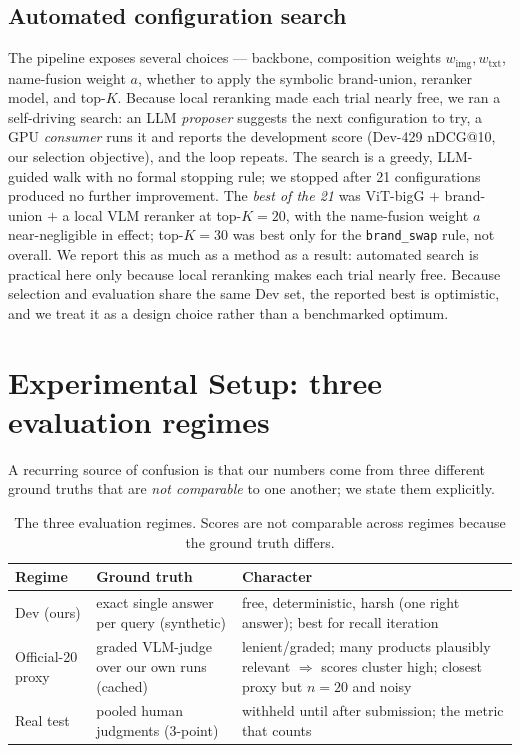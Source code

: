 \documentclass[sigconf,nonacm]{acmart}
\begin{document}
\subsection{Automated configuration search}
\label{sec:autoresearch}
The pipeline exposes several choices --- backbone, composition weights
$w_\text{img},w_\text{txt}$, name-fusion weight $a$, whether to apply the
symbolic brand-union, reranker model, and top-$K$. Because local reranking made each
trial nearly free, we ran a self-driving search: an LLM \emph{proposer}
suggests the next configuration to try, a GPU \emph{consumer} runs it and
reports the development score (Dev-429 nDCG@10, our selection objective), and
the loop repeats. The search is a greedy,
LLM-guided walk with no formal stopping rule; we stopped after 21
configurations produced no further improvement. The \emph{best of the 21}
was ViT-bigG $+$ brand-union $+$ a local VLM reranker at top-$K{=}20$, with
the name-fusion weight $a$ near-negligible in effect; top-$K{=}30$ was best
only for the \texttt{brand\_swap} rule, not overall. We report
this as much as a method as a result: automated search is practical here only
because local reranking makes each trial nearly free. Because selection and
evaluation share the same Dev set, the reported best is optimistic, and we
treat it as a design choice rather than a benchmarked optimum.

\section{Experimental Setup: three evaluation regimes}
\label{sec:setup}
A recurring source of confusion is that our numbers come from three
different ground truths that are \emph{not comparable} to one another; we
state them explicitly.

\begin{table}[t]
\centering\small
\caption{The three evaluation regimes. Scores are not comparable across
regimes because the ground truth differs.}
\label{tab:regimes}
\begin{tabular}{@{}p{1.7cm}p{2.4cm}p{3.0cm}@{}}
\toprule
Regime & Ground truth & Character \\
\midrule
Dev (ours) & exact single answer per query (synthetic) &
free, deterministic, harsh (one right answer); best for recall iteration \\
\addlinespace
Official-20 proxy & graded VLM-judge over our own runs (cached) &
lenient/graded; many products plausibly relevant $\Rightarrow$ scores
cluster high; closest proxy but $n{=}20$ and noisy \\
\addlinespace
Real test & pooled human judgments (3-point) &
withheld until after submission; the metric that counts \\
\bottomrule
\end{tabular}
\end{table}
\end{document}
